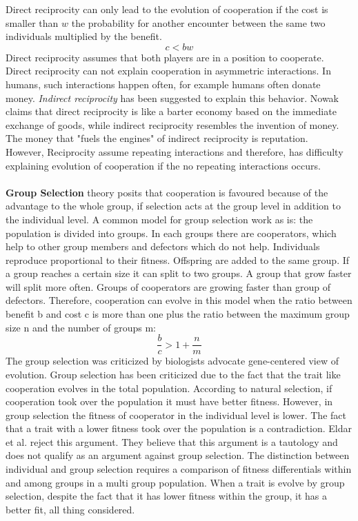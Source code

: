 \documentclass{article}
\begin{document}
Direct reciprocity can only lead to the evolution of cooperation if the cost is smaller than $w$ the probability for another encounter between the same two individuals multiplied by the benefit. 
\begin{equation} \label{reciprocity}
c<bw
\end{equation}
Direct reciprocity assumes that both players are in a position to cooperate. Direct reciprocity can not explain cooperation in asymmetric interactions. In humans, such interactions happen often, for example humans often donate money. 
\textit{Indirect reciprocity} has been suggested to explain this behavior. 
Nowak \cite{nowak2006five} claims that direct reciprocity is like a barter economy based on the immediate exchange of goods, while indirect reciprocity resembles the invention of money. The money that "fuels the engines" of indirect reciprocity is reputation. 
\\However, Reciprocity assume repeating interactions and therefore, has difficulty explaining evolution of cooperation if the no repeating interactions occurs. 
\\\\\textbf{Group Selection} theory posits that cooperation is favoured because of the advantage to the whole group, if selection acts at the group level in addition to the individual level. A common model for group selection work as is: the population is divided into groups. In each groups there are cooperators, which help to other group members and defectors which do not help. 
Individuals reproduce proportional to their fitness. Offspring are added to the same group.
If a group reaches a certain size it can split to two groups. A group that grow faster will split more often. Groups of cooperators are growing faster than group of defectors.
Therefore, cooperation can evolve in this model when the ratio between benefit b and cost c is more than one plus the ratio between the maximum group size n and the number of groups m:
\begin{equation} \label{groupselection}
\frac{b}{c}>1+\frac{n}{m}
\end{equation}
The group selection was criticized by biologists advocate gene-centered view of evolution. Group selection has been criticized due to the fact that the trait like cooperation evolves in the total population. According to natural selection, if cooperation took over the population it must have better fitness. However, in group selection the fitness of cooperator in the individual level is lower. The fact that a trait with a lower fitness took over the population is a contradiction. Eldar et al. \cite{eldakar2011eight} reject this argument. They believe that this argument is a tautology and does not qualify as an argument against group selection. The distinction between individual and group selection requires a comparison of fitness differentials within and among groups in a multi group population. When a trait is evolve by group selection, despite the fact that it has lower fitness within the group, it has a better fit, all thing considered. 
\end{document}
